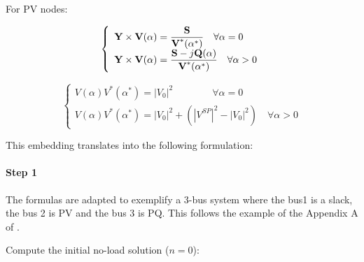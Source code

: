 \documentclass[a4paper,twoside,fleqn]{tufte-book}
\begin{document}
For PV nodes:

\begin{equation}
\left\{
\begin{array}{ll}
\mathlarger{\textbf{Y} \times \textbf{V}(\alpha) = \frac{ \textbf{S}}{\textbf{V}^*(\alpha^*)}} \quad \forall \alpha=0\\
\mathlarger{\textbf{Y} \times \textbf{V}(\alpha) = \frac{ \textbf{S} - j \textbf{Q}(\alpha)}{\textbf{V}^*(\alpha^*)}} \quad \forall \alpha>0
\end{array}
\right.
\end{equation}

\begin{equation}
\left\{
\begin{array}{ll}
V(\alpha)V^*(\alpha^*) = |V_0|^2\quad \quad \quad \quad \forall \alpha=0\\
V(\alpha)V^*(\alpha^*) = |V_0|^2 + (|V^{SP}|^2-|V_0|^2) \quad \forall \alpha>0
\end{array}
\right.
\end{equation}




This embedding translates into the following formulation:

\paragraph{Step 1}

The formulas are adapted to exemplify a 3-bus system where the bus1 is a slack, the bus 2 is PV and the bus 3 is PQ. This follows the example of the Appendix A of \cite{liu2017online}.

\vspace{1cm}

Compute the initial no-load solution ($n=0$):
\end{document}
